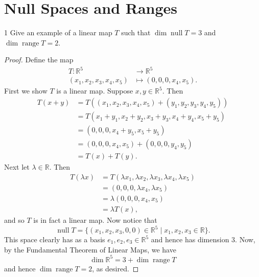 \documentclass[11pt]{extarticle}
\newenvironment{problem}[1]{\begin{prob*}{#1}{}}{\end{prob*}}
\newcommand{\R}{\mathbb{R}}
\DeclareMathOperator{\Null}{null}
\DeclareMathOperator{\Range}{range}
\begin{document}
\section{Null Spaces and Ranges}

\begin{problem}{1}
Give an example of a linear map $T$ such that $\dim\Null T = 3$ and $\dim\Range T = 2$.
\end{problem}
\begin{proof}
Define the map
\begin{align*}
T:\R^5 &\to \R^5\\
  (x_1, x_2, x_3,x_4, x_5) &\mapsto (0, 0, 0, x_4, x_5).
\end{align*}
First we show $T$ is a linear map.  Suppose $x,y\in\R^5$.  Then
\begin{align*}
T(x + y) &= T((x_1, x_2, x_3,x_4, x_5) + (y_1, y_2, y_3,y_4, y_5) )\\
&= T(x_1+y_1, x_2+y_2, x_3+y_3,x_4+y_4, x_5+y_5)\\
&= (0, 0, 0, x_4 + y_5, x_5 + y_5)\\
&= (0, 0, 0, x_4, x_5) + (0, 0, 0, y_4, y_5)\\
&= T(x) + T(y).
\end{align*}
Next let $\lambda\in\R$.  Then
\begin{align*}
T(\lambda x) &= T(\lambda x_1, \lambda x_2, \lambda x_3, \lambda x_4, \lambda x_5) \\
&= (0, 0, 0, \lambda x_4, \lambda x_5)\\
&= \lambda(0,0,0,x_4, x_5)\\
&= \lambda T(x),
\end{align*}
and so $T$ is in fact a linear map.  Now notice that
\begin{equation*}
\Null T = \{(x_1,x_2,x_3,0,0)\in\R^5\mid x_1, x_2, x_3\in\R\}.
\end{equation*}  
This space clearly has as a basis $e_1,e_2,e_3\in\R^5$ and hence has dimension $3$.  Now, by the Fundamental Theorem of Linear Maps, we have 
\begin{equation*}
\dim\R^5 = 3 + \dim\Range T
\end{equation*}
and hence $\dim\Range T = 2$, as desired.
\end{proof}
\end{document}
